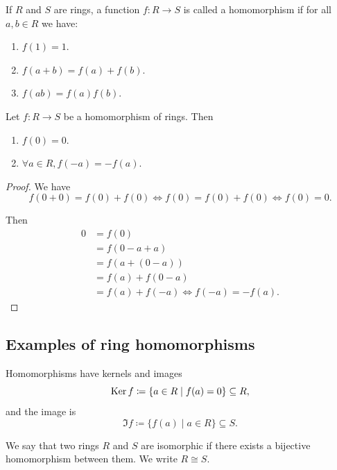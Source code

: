 \documentclass[10pt, a4paper]{article}
\begin{document}
\begin{definition}
    If $R$ and $S$ are rings,
    a function $f : R \to S$ is called a homomorphism if for all $a, b \in R$ we have:
    \begin{enumerate}[label = \roman*)]
        \item $f(1) = 1$.

        \item $f(a + b) = f(a) + f(b)$.

        \item $f(ab) = f(a)f(b)$.
    \end{enumerate}
\end{definition}

\begin{lemma}
    Let $f : R \to S$ be a homomorphism of rings.
    Then
    \begin{enumerate}
        \item $f(0) = 0$.

        \item $\forall a \in R, f(-a) = -f(a)$.
    \end{enumerate}

    \begin{proof}
        We have
        \[
        f(0 + 0) = f(0) + f(0) \iff f(0) = f(0) + f(0) \iff f(0) = 0.
        \]

        Then
        \begin{align*}
            0 &= f(0) \\
            &= f(0 - a + a) \\
            &= f(a + (0 - a)) \\
            &= f(a) + f(0 - a) \\
            &= f(a) + f(-a) \iff f(-a) = -f(a).
        \end{align*}
    \end{proof}
\end{lemma}

\subsection{Examples of ring homomorphisms}

Homomorphisms have kernels and images
\[
\operatorname{Ker}{f} \coloneqq \{a \in R\mid f(a) = 0\}\subseteq R,
\]
and the image is
\[
\Im{f} \coloneqq \{f(a) \mid a \in R\} \subseteq S.
\]

\begin{definition}[Isomorphism]
    We say that two rings $R$ and $S$ are isomorphic if there exists a bijective homomorphism between them.
    We write $R \cong S$.
\end{definition}
\end{document}
